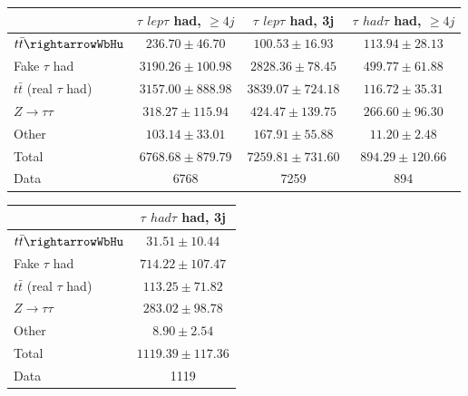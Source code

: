 \begin{table}
\begin{center}
  \begin{tabular}{ | l |  c |  c |  c | }
    \hline \hline 
     &  $\tau$ ${lep}\tau$ {had}, $\geq4j$  &  $\tau$ ${lep}\tau$ {had}, 3j  &  $\tau$ ${had}\tau$ {had}, $\geq4j$  \\ 
    \hline 
     $t\bar{t}\rightarrowWbHu$  &   $ 236.70 \pm 46.70 $ &   $ 100.53 \pm 16.93 $ &   $ 113.94 \pm 28.13 $ \\ 
     Fake $\tau$ {had}  &   $ 3190.26 \pm 100.98 $ &   $ 2828.36 \pm 78.45 $ &   $ 499.77 \pm 61.88 $ \\ 
     $t\bar{t}$ (real $\tau$ {had})  &   $ 3157.00 \pm 888.98 $ &   $ 3839.07 \pm 724.18 $ &   $ 116.72 \pm 35.31 $ \\ 
     $Z\rightarrow\tau\tau$  &   $ 318.27 \pm 115.94 $ &   $ 424.47 \pm 139.75 $ &   $ 266.60 \pm 96.30 $ \\ 
    Other  &   $ 103.14 \pm 33.01 $ &   $ 167.91 \pm 55.88 $ &   $ 11.20 \pm 2.48 $ \\ 
    Total  &   $ 6768.68 \pm 879.79 $ &   $ 7259.81 \pm 731.60 $ &   $ 894.29 \pm 120.66 $ \\ 
    \hline 
    Data  & 6768  & 7259  & 894  \\ 
    \hline \hline 
  \end{tabular} 


  \begin{tabular}{ | l |  c | }
    \hline \hline 
     &  $\tau$ ${had}\tau$ {had}, 3j  \\ 
    \hline 
     $t\bar{t}\rightarrowWbHu$  &   $ 31.51 \pm 10.44 $ \\ 
     Fake $\tau$ {had}  &   $ 714.22 \pm 107.47 $ \\ 
     $t\bar{t}$ (real $\tau$ {had})  &   $ 113.25 \pm 71.82 $ \\ 
     $Z\rightarrow\tau\tau$  &   $ 283.02 \pm 98.78 $ \\ 
    Other  &   $ 8.90 \pm 2.54 $ \\ 
    Total  &   $ 1119.39 \pm 117.36 $ \\ 
    \hline 
    Data  & 1119  \\ 
    \hline \hline 
  \end{tabular} 


\end{center}
\end{table}
